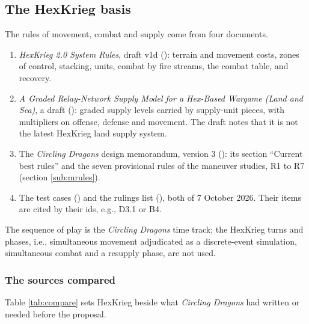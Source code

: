 \documentclass[11pt]{article}
\begin{document}
\subsection{The HexKrieg basis}\label{sub:hexkrieg}
The rules of movement, combat and supply come from four documents.
\begin{enumerate}
\item \emph{HexKrieg 2.0 System Rules}, draft v1d (): terrain and movement costs, zones of control, stacking, units, combat by fire streams, the combat table, and recovery.
\item \emph{A Graded Relay-Network Supply Model for a Hex-Based Wargame (Land and Sea)}, a draft (): graded supply levels carried by supply-unit pieces, with multipliers on offense, defense and movement. The draft notes that it is not the latest HexKrieg land supply system.
\item The \emph{Circling Dragons} design memorandum, version 3 (): its section ``Current best rules'' and the seven provisional rules of the maneuver studies, R1 to R7 (section \ref{sub:mrules}).
\item The test cases () and the rulings list (), both of 7 October 2026. Their items are cited by their ids, e.g., D3.1 or B4.
\end{enumerate}
The sequence of play is the \emph{Circling Dragons} time track; the HexKrieg turns and phases, i.e., simultaneous movement adjudicated as a discrete-event simulation, simultaneous combat and a resupply phase, are not used.

\subsubsection{The sources compared}\label{sub:compare}
Table \ref{tab:compare} sets HexKrieg beside what \emph{Circling Dragons} had written or needed before the proposal.
\end{document}
